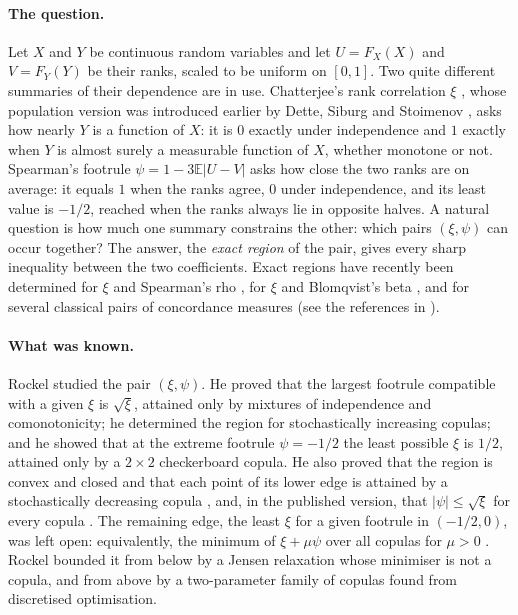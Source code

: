 \documentclass[11pt,a4paper]{article}
\theoremstyle{remark}
\newcommand{\E}{\mathbb E}
\newcommand{\1}{\mathbf 1}
\begin{document}
\paragraph{The question.} Let $X$ and $Y$ be continuous random variables and let $U=F_X(X)$ and $V=F_Y(Y)$ be their ranks, scaled to be uniform on $[0,1]$. Two quite different summaries of their dependence are in use. Chatterjee's rank correlation $\xi$ \cite{chatterjee}, whose population version was introduced earlier by Dette, Siburg and Stoimenov \cite{dette}, asks how nearly $Y$ is a function of $X$: it is $0$ exactly under independence and $1$ exactly when $Y$ is almost surely a measurable function of $X$, whether monotone or not. Spearman's footrule $\psi=1-3\E|U-V|$ asks how close the two ranks are on average: it equals $1$ when the ranks agree, $0$ under independence, and its least value is $-1/2$, reached when the ranks always lie in opposite halves. A natural question is how much one summary constrains the other: which pairs $(\xi,\psi)$ can occur together? The answer, the \emph{exact region} of the pair, gives every sharp inequality between the two coefficients. Exact regions have recently been determined for $\xi$ and Spearman's rho \cite{ar}, for $\xi$ and Blomqvist's beta \cite{olr}, and for several classical pairs of concordance measures (see the references in \cite{rockel,ar2}).

\paragraph{What was known.} Rockel \cite{rockel} studied the pair $(\xi,\psi)$. He proved that the largest footrule compatible with a given $\xi$ is $\sqrt\xi$, attained only by mixtures of independence and comonotonicity; he determined the region for stochastically increasing copulas; and he showed that at the extreme footrule $\psi=-1/2$ the least possible $\xi$ is $1/2$, attained only by a $2\times2$ checkerboard copula. He also proved that the region is convex and closed and that each point of its lower edge is attained by a stochastically decreasing copula \cite[Theorem~3.2]{rockel}, and, in the published version, that $|\psi|\le\sqrt\xi$ for every copula \cite[Corollary~2]{rockel}. The remaining edge, the least $\xi$ for a given footrule in $(-1/2,0)$, was left open: equivalently, the minimum of $\xi+\mu\psi$ over all copulas for $\mu>0$ \cite[eq.~(16)]{rockel}. Rockel bounded it from below by a Jensen relaxation whose minimiser is not a copula, and from above by a two-parameter family of copulas found from discretised optimisation.
\end{document}
